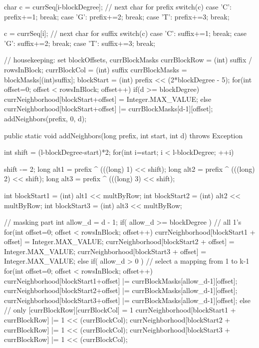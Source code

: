 \documentclass[oneside,12pt]{DISCSthesis}
\begin{document}
{\begin{footnotesize}
\begin{verbatimtab}[2]
{{{      char c = currSeq[i-blockDegree];   // next char for prefix
      switch(c) {
        case 'C': prefix+=1; break;
        case 'G': prefix+=2; break;
        case 'T': prefix+=3; break;
      }

      c = currSeq[i];           // next char for suffix
      switch(c) {
        case 'C': suffix+=1; break;
        case 'G': suffix+=2; break;
        case 'T': suffix+=3; break;
      }
      
      // housekeeping: set blockOffsets, currBlockMasks
      currBlockRow = (int) suffix / rowsInBlock;
      currBlockCol = (int) suffix %
      currBlockMasks = blockMasks[(int)suffix];
      blockStart = (int) prefix << (2*blockDegree - 5);
      for(int offset=0; offset < rowsInBlock; offset++) {
        if(d >= blockDegree)
          currNeighborhood[blockStart+offset] = Integer.MAX_VALUE;
        else
          currNeighborhood[blockStart+offset]
                       |= currBlockMasks[d-1][offset];
      }
      addNeighbors(prefix, 0, d);
    }
  }

  public static void addNeighbors(long prefix, 
                                  int start, int d) throws Exception {
    int shift = (l-blockDegree-start)*2;
    for(int i=start; i < l-blockDegree; ++i) {
      shift -= 2;
      long alt1 = prefix ^ (((long) 1) << shift);
      long alt2 = prefix ^ (((long) 2) << shift);
      long alt3 = prefix ^ (((long) 3) << shift);

      int blockStart1 = (int) alt1 << multByRow;
      int blockStart2 = (int) alt2 << multByRow;
      int blockStart3 = (int) alt3 << multByRow;

      // masking part
      int allow_d = d - 1;
      if( allow_d >= blockDegree ) {    // all 1's
        for(int offset=0; offset < rowsInBlock; offset++) {
          currNeighborhood[blockStart1 + offset] = Integer.MAX_VALUE;
          currNeighborhood[blockStart2 + offset] = Integer.MAX_VALUE;
          currNeighborhood[blockStart3 + offset] = Integer.MAX_VALUE;
        }
      }
      else if( allow_d > 0 ) {      // select a mapping from 1 to k-1
        for(int offset=0; offset < rowsInBlock; offset++) {
          currNeighborhood[blockStart1+offset]
                       |= currBlockMasks[allow_d-1][offset];
          currNeighborhood[blockStart2+offset]
                       |= currBlockMasks[allow_d-1][offset];
          currNeighborhood[blockStart3+offset]
                       |= currBlockMasks[allow_d-1][offset];
        }
      }
      else {      // only [currBlockRow][currBlockCol] = 1
        currNeighborhood[blockStart1 + currBlockRow] |= 1 << (currBlockCol);
        currNeighborhood[blockStart2 + currBlockRow] |= 1 << (currBlockCol);
        currNeighborhood[blockStart3 + currBlockRow] |= 1 << (currBlockCol);
      }

}}}
\end{verbatimtab}
\end{footnotesize}}
\end{document}
